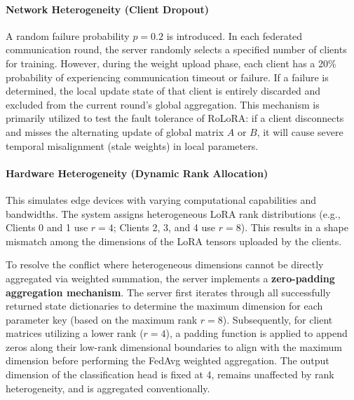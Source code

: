 \paragraph{\textbf{Network Heterogeneity (Client Dropout)}}
A random failure probability $p = 0.2$ is introduced. In each federated communication round, the server randomly selects a specified number of clients for training. However, during the weight upload phase, each client has a 20\% probability of experiencing communication timeout or failure. If a failure is determined, the local update state of that client is entirely discarded and excluded from the current round's global aggregation. This mechanism is primarily utilized to test the fault tolerance of RoLoRA: if a client disconnects and misses the alternating update of global matrix $A$ or $B$, it will cause severe temporal misalignment (stale weights) in local parameters. \cite{xie2019asynchronous}
\paragraph{\textbf{Hardware Heterogeneity (Dynamic Rank Allocation})}
This simulates edge devices with varying computational capabilities and bandwidths. The system assigns heterogeneous LoRA rank distributions (e.g., Clients 0 and 1 use $r=4$; Clients 2, 3, and 4 use $r=8$). This results in a shape mismatch among the dimensions of the LoRA tensors uploaded by the clients.

To resolve the conflict where heterogeneous dimensions cannot be directly aggregated via weighted summation, the server implements a \textbf{zero-padding aggregation mechanism}. The server first iterates through all successfully returned state dictionaries to determine the maximum dimension for each parameter key (based on the maximum rank $r=8$). Subsequently, for client matrices utilizing a lower rank ($r=4$), a padding function is applied to append zeros along their low-rank dimensional boundaries to align with the maximum dimension before performing the FedAvg weighted aggregation. The output dimension of the classification head is fixed at 4, remains unaffected by rank heterogeneity, and is aggregated conventionally.



